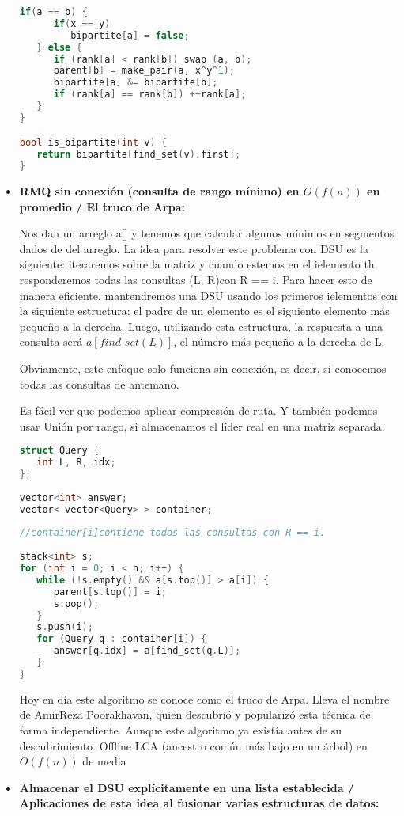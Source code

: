 \begin{itemize}
\begin{lstlisting}[language=C++]
   if(a == b) {
      if(x == y)
         bipartite[a] = false;
   } else {
      if (rank[a] < rank[b]) swap (a, b);
      parent[b] = make_pair(a, x^y^1);
      bipartite[a] &= bipartite[b];
      if (rank[a] == rank[b]) ++rank[a];
   }
}

bool is_bipartite(int v) {
   return bipartite[find_set(v).first];
}
\end{lstlisting} 	 
	 \item \textbf{RMQ sin conexión (consulta de rango mínimo) en $O(f(n))$ en promedio / El truco de Arpa:}
	 
	 Nos dan un arreglo a[] y tenemos que calcular algunos mínimos en segmentos dados de del arreglo. La idea para resolver este problema con DSU es la siguiente: iteraremos sobre la matriz y cuando estemos en el ielemento th responderemos todas las consultas (L, R)con R == i. Para hacer esto de manera eficiente, mantendremos una DSU usando los primeros ielementos con la siguiente estructura: el padre de un elemento es el siguiente elemento más pequeño a la derecha. Luego, utilizando esta estructura, la respuesta a una consulta será $a[find\_set(L)]$, el número más pequeño a la derecha de L.
	 
	 Obviamente, este enfoque solo funciona sin conexión, es decir, si conocemos todas las consultas de antemano.
	 
	 Es fácil ver que podemos aplicar compresión de ruta. Y también podemos usar Unión por rango, si almacenamos el líder real en una matriz separada.
\begin{lstlisting}[language=C++]
struct Query {
   int L, R, idx;
};
	 
vector<int> answer;
vector< vector<Query> > container;
	 
//container[i]contiene todas las consultas con R == i.
	 
stack<int> s;
for (int i = 0; i < n; i++) {
   while (!s.empty() && a[s.top()] > a[i]) {
      parent[s.top()] = i;
      s.pop();
   }
   s.push(i);
   for (Query q : container[i]) {
      answer[q.idx] = a[find_set(q.L)];
   }
}
\end{lstlisting} 
	 Hoy en día este algoritmo se conoce como el truco de Arpa. Lleva el nombre de AmirReza Poorakhavan, quien descubrió y popularizó esta técnica de forma independiente. Aunque este algoritmo ya existía antes de su descubrimiento.
	 Offline LCA (ancestro común más bajo en un árbol) en $O(f(n))$ de media
	 
	 
	 \item \textbf{Almacenar el DSU explícitamente en una lista establecida / Aplicaciones de esta idea al fusionar varias estructuras de datos:}
	 

\end{itemize}
